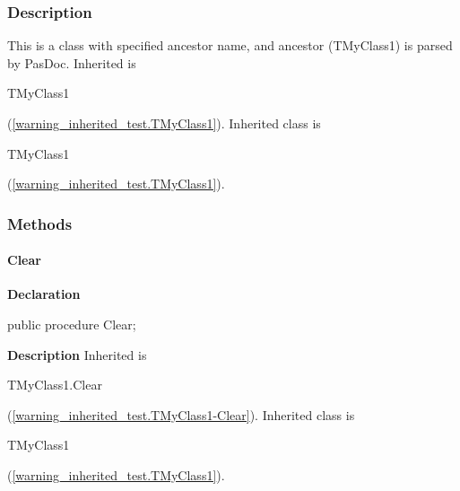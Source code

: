 \documentclass{report}
\newif\ifpdf
\begin{document}
\subsubsection*{\large{\textbf{Description}}\normalsize\hspace{1ex}\hfill}
This is a class with specified ancestor name, and ancestor (TMyClass1) is parsed by PasDoc. Inherited is \begin{ttfamily}TMyClass1\end{ttfamily}(\ref{warning_inherited_test.TMyClass1}). Inherited class is \begin{ttfamily}TMyClass1\end{ttfamily}(\ref{warning_inherited_test.TMyClass1}).\subsubsection*{\large{\textbf{Methods}}\normalsize\hspace{1ex}\hfill}
\paragraph*{Clear}\hspace*{\fill}

\label{warning_inherited_test.TMyClass2-Clear}
\begin{list}{}{
\setlength{\itemindent}{0cm}
\setlength{\listparindent}{0cm}
\setlength{\leftmargin}{\evensidemargin}
\addtolength{\leftmargin}{\tmplength}
\settowidth{\labelsep}{X}
\addtolength{\leftmargin}{\labelsep}
\setlength{\labelwidth}{\tmplength}
}
\item[\textbf{Declaration}\hfill]
\ifpdf
\begin{flushleft}
\fi
\begin{ttfamily}
public procedure Clear;\end{ttfamily}

\ifpdf
\end{flushleft}
\fi

\par
\item[\textbf{Description}]
Inherited is \begin{ttfamily}TMyClass1.Clear\end{ttfamily}(\ref{warning_inherited_test.TMyClass1-Clear}). Inherited class is \begin{ttfamily}TMyClass1\end{ttfamily}(\ref{warning_inherited_test.TMyClass1}).

\end{list}
\end{document}

